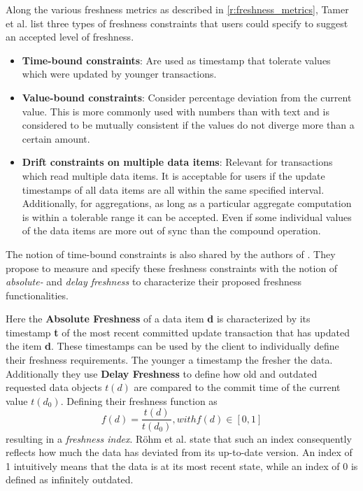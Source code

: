 Along the various freshness metrics as described in \ref{r:freshness_metrics}, Tamer et al. \cite{tamer:2005} list three types of freshness constraints that users could specify to
suggest an accepted level of freshness.
\begin{itemize}
    \item \textbf{Time-bound constraints}: Are used as timestamp that tolerate values which were updated by younger transactions. 

    \item \textbf{Value-bound constraints}: Consider percentage deviation from the current value. This is more commonly used with numbers than with text and is considered to
    be mutually consistent if the values do not diverge more than a certain amount.

    \item \textbf{Drift constraints on multiple data items}: Relevant for transactions which read multiple data items. It is acceptable for users if the update timestamps 
    of all data items are all within the same specified interval. Additionally, for aggregations, as long as a particular aggregate computation 
    is within a tolerable range it can be accepted. Even if some individual values of the data items are more out of sync than the compound operation.

\end{itemize}

The notion of time-bound constraints is also shared by the authors of \cite{voicu:2010}. They propose to measure and specify these freshness constraints 
with the notion of \emph{absolute-} and \emph{delay freshness} to characterize their proposed freshness functionalities.

Here the \textbf{Absolute Freshness} of a data item \textbf{d} is characterized by its timestamp \textbf{t}
of the most recent committed update transaction that has updated the item \textbf{d}.
These timestamps can be used by the client to individually define their freshness requirements. The younger a timestamp the fresher the data.
Additionally they use \textbf{Delay Freshness} to define how old and outdated requested data objects $t(d)$ are compared to the commit time of the current value $t(d_0)$.
Defining their freshness function as 
\begin{equation}
    f(d) = \frac{t(d)}{t(d_0)}, with f(d) \in [0,1]
\end{equation} 
resulting in a \emph{freshness index}.
Röhm et al. \cite{rohm:2002} state that such an index consequently reflects how much the data has deviated from its up-to-date version.
An index of 1 intuitively means that the data is at its most recent state, while an index of 0 is defined as infinitely outdated.

